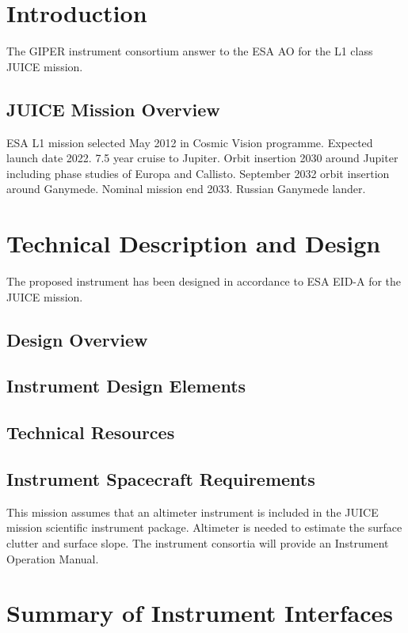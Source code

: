 \section{Introduction}
\label{sec:introduction}
%
The GIPER instrument consortium answer to the ESA \ac{AO}\cite{JUICE_AO} for the L1 class \ac{JUICE} mission.
%
%
\subsection{JUICE Mission Overview}
ESA L1 mission selected May 2012 in Cosmic Vision programme. Expected launch date 2022. 7.5 year cruise to Jupiter. Orbit insertion 2030 around Jupiter including phase studies of Europa and Callisto. September 2032 orbit insertion around Ganymede. Nominal mission end 2033. Russian Ganymede lander.
%
%



\section{Technical Description and Design}
%
The proposed instrument has been designed in accordance to ESA \ac{EID-A} for the \ac{JUICE} mission\cite{EIDA}.
%
\subsection{Design Overview}
\subsection{Instrument Design Elements}
\subsection{Technical Resources}
\subsection{Instrument Spacecraft Requirements}
This mission assumes that an altimeter instrument is included in the JUICE mission scientific instrument package. Altimeter is needed to estimate the surface clutter and surface slope.
%
The instrument consortia will provide an Instrument Operation Manual.
%
\section{Summary of Instrument Interfaces}
%
